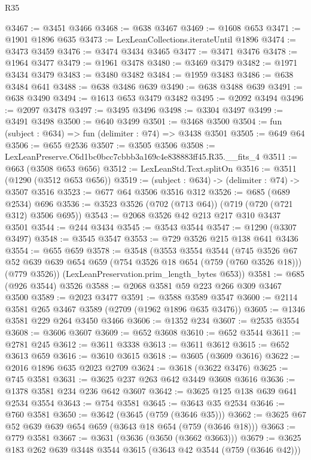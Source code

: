 \begin{lexlean}{R35}
\begin{coremodule}
@3467 := @3451 @3466
@3468 := @638 @3467
@3469 := @1608 @653
@3471 := @1901 @1896 @635
@3473 := LexLeanCollections.iterateUntil @1896
@3474 := @3473 @3459
@3476 := @3474 @3434 @3465
@3477 := @3471 @3476
@3478 := @1964 @3477
@3479 := @1961 @3478
@3480 := @3469 @3479
@3482 := @1971 @3434 @3479
@3483 := @3480 @3482
@3484 := @1959 @3483
@3486 := @638 @3484 @641
@3488 := @638 @3486 @639
@3490 := @638 @3488 @639
@3491 := @638 @3490
@3494 := @1613 @653 @3479 @3482
@3495 := @2092 @3494
@3496 := @2097 @3478
@3497 := @3495 @3496
@3498 := @3304 @3497
@3499 := @3491 @3498
@3500 := @640 @3499
@3501 := @3468 @3500
@3504 := fun (subject : @634) => fun (delimiter : @74) => @3438 @3501
@3505 := @649 @64
@3506 := @655 @2536
@3507 := @3505 @3506
@3508 := LexLeanPreserve.C6d1bc0bcc7cbbb3a169c4e838883ff45.R35.__fits_4
@3511 := @663 (@3508 @653 @656)
@3512 := LexLeanStd.Text.splitOn
@3516 := @3511 (@1290 (@3512 @653 @656))
@3519 := (subject : @634) -> (delimiter : @74) -> @3507 @3516
@3523 := @677 @64 @3506 @3516 @312
@3526 := @685 (@689 @2534) @696
@3536 := @3523 @3526 (@702 (@713 @64)) (@719 (@720 (@721 @312) @3506 @695))
@3543 := @2068 @3526 @42 @213 @217 @310 @3437 @3501
@3544 := @244 @3434
@3545 := @3543 @3544
@3547 := @1290 (@3307 @3497)
@3548 := @3545 @3547
@3553 := @729 @3526 @215 @138 @641 @3436
@3554 := @655 @659
@3578 := @3548
    (@3553
      @3554
      @3544
      (@745
        @3526
        @67
        @52
        @639
        @639
        @654
        @659
        (@754 @3526 @18 @654 (@759 (@760 @3526 @18)))
        (@779 @3526))
      (LexLeanPreservation.prim_length_bytes @653))
@3581 := @685 (@926 @3544) @3526
@3588 := @2068 @3581 @59 @223 @266 @309 @3467 @3500
@3589 := @2023 @3477
@3591 := @3588 @3589 @3547
@3600 := @2114 @3581 @265 @3467 @3589 (@2709 (@1962 @1896 @635 @3476))
@3605 := @1346 @3581 @229 @264 @3450 @3466
@3606 := @1352 @234
@3607 := @2535 @3554
@3608 := @3606 @3607
@3609 := @652 @3608
@3610 := @652 @3544
@3611 := @2781 @245
@3612 := @3611 @3338
@3613 := @3611 @3612
@3615 := @652 @3613 @659
@3616 := @3610 @3615
@3618 := @3605 (@3609 @3616)
@3622 := @2016 @1896 @635 @2023 @2709
@3624 := @3618 (@3622 @3476)
@3625 := @745 @3581
@3631 := @3625 @237 @263 @642 @3449 @3608 @3616
@3636 := @1378 @3581 @234 @236 @642 @3607
@3642 := @3625 @125 @138 @639 @641 @2534 @3554
@3643 := @754 @3581
@3645 := @3643 @35 @2534
@3646 := @760 @3581
@3650 := @3642 (@3645 (@759 (@3646 @35)))
@3662 := @3625 @67 @52 @639 @639 @654 @659 (@3643 @18 @654 (@759 (@3646 @18)))
@3663 := @779 @3581
@3667 := @3631 (@3636 (@3650 (@3662 @3663)))
@3679 := @3625 @183 @262 @639 @3448 @3544 @3615 (@3643 @42 @3544 (@759 (@3646 @42)))

\end{coremodule}
\end{lexlean}
